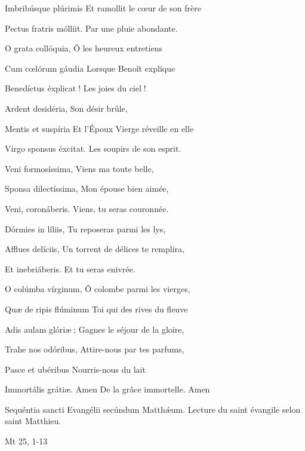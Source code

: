 \begin{paracol}{2}
Imbribúsque plúrimis
\switchcolumn
Et ramollit le cœur de son frère
\switchcolumn*

Pectus fratris mólliit.
\switchcolumn
Par une pluie abondante.
\switchcolumn*

O grata collóquia,
\switchcolumn
Ô les heureux entretiens
\switchcolumn*

Cum cœlórum gáudia
\switchcolumn
Lorsque Benoît explique
\switchcolumn*

Benedíctus éxplicat !
\switchcolumn
Les joies du ciel !
\switchcolumn*

Ardent desidéria,
\switchcolumn
Son désir brûle,
\switchcolumn*

Mentis et suspíria
\switchcolumn
Et l’Époux Vierge réveille en elle
\switchcolumn*

Virgo sponsus éxcitat.
\switchcolumn
Les soupirs de son esprit.
\switchcolumn*

Veni formosíssima,
\switchcolumn
Viens ma toute belle,
\switchcolumn*

Sponsa dilectíssima,
\switchcolumn
Mon épouse bien aimée,
\switchcolumn*

Veni, coronáberis.
\switchcolumn
Viens, tu seras couronnée.
\switchcolumn*

Dórmies in líliis,
\switchcolumn
Tu reposeras parmi les lys,
\switchcolumn*

Afflues delíciis,
\switchcolumn
Un torrent de délices te remplira,
\switchcolumn*

Et inebriáberis.
\switchcolumn
Et tu seras enivrée.
\switchcolumn*

O colúmba vírginum,
\switchcolumn
Ô colombe parmi les vierges,
\switchcolumn*

Quæ de ripis flúminum
\switchcolumn
Toi qui des rives du fleuve
\switchcolumn*

Adis aulam glóriæ ;
\switchcolumn
Gagnes le séjour de la gloire,
\switchcolumn*

Trahe nos odóribus,
\switchcolumn
Attire-nous par tes parfums,
\switchcolumn*

Pasce et ubéribus
\switchcolumn
Nourris-nous du lait
\switchcolumn*

Immortális grátiæ. Amen
\switchcolumn
De la grâce immortelle. Amen
\switchcolumn*

Sequéntia sancti Evangélii secúndum Matthǽum.
\switchcolumn
Lecture du saint évangile selon saint Matthieu.
\switchcolumn*

Mt 25, 1-13
\switchcolumn

\switchcolumn*


\end{paracol}
